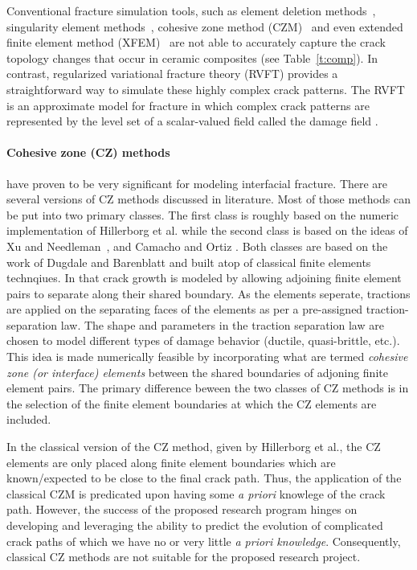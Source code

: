 \documentclass[10pt,letterpaper]{article}
\begin{document}
    Conventional fracture simulation tools, such as element deletion methods~\cite{komori2001simulation,saanouni2004numerical}, singularity element methods~\cite{henshell1975crack,barsoum1977triangular,akin1976generation}, cohesive zone method (CZM)~\cite{needleman1987continuum,tan2007constitutive} and even extended finite element method (XFEM)~\cite{dolbow1999finite, stolarska2001modelling, belytschko2003dynamic,huang2003modeling} are not able to accurately capture the crack topology changes that occur in ceramic composites (see Table~\ref{t:comp}). In contrast, regularized variational fracture theory (RVFT) provides a straightforward way to simulate these highly complex crack patterns. The RVFT is an approximate model for fracture in which complex crack patterns are represented by the level set of a scalar-valued field called the damage field \cite{bourdin2000numerical}.

    \paragraph{Cohesive zone (CZ) methods} have proven to be very significant for modeling interfacial fracture. There are several versions of CZ methods discussed in literature. Most of those methods can be put into two primary classes. The first class is roughly based on the numeric implementation of Hillerborg et al.\cite{hillerborg1976analysis}  while the second class is based on the ideas of Xu and Needleman~\cite{xu1994numerical}, and Camacho and Ortiz \cite{camacho1996computational}. Both classes are based on the work of Dugdale \cite{dugdale1960yielding} and Barenblatt \cite{barenblatt1962mathematical} and built atop of classical finite elements technqiues. In that crack growth is modeled by allowing adjoining finite  element pairs to separate along their shared boundary. As the elements seperate, tractions are applied on the separating faces of the elements as per a pre-assigned traction-separation law. The shape and parameters in the traction separation law are chosen to model different types of damage behavior (ductile, quasi-brittle, etc.). This idea is made numerically feasible by incorporating what are termed \textit{cohesive zone (or interface) elements} between the shared boundaries of adjoning finite element pairs. The primary difference beween the two classes of CZ methods is in the selection of the finite element boundaries at which the CZ elements are included.

    In the classical version of the CZ method, given by Hillerborg et al., the CZ elements are only placed along finite element boundaries which are known\slash expected to be close to the final crack path. Thus, the application of the classical CZM is  predicated upon having some \textit{a priori} knowlege of the crack path. However, the success of the proposed research program hinges on developing and leveraging the ability to predict the evolution of complicated crack paths of which we have no or very little \textit{a priori knowledge}. Consequently, classical CZ methods are not suitable for the proposed research project.%
\end{document}
